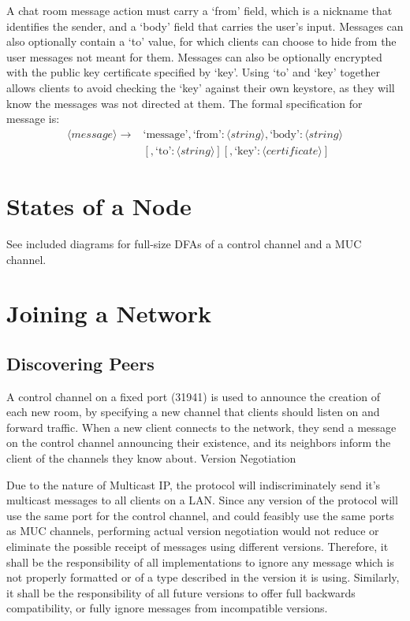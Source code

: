 \documentclass{article}
\begin{document}
A chat room message action must carry a `from' field, which is a nickname that
identifies the sender, and a `body' field that carries the user's input.
Messages can also optionally contain a `to' value, for which clients can choose
to hide from the user messages not meant for them. Messages can also be
optionally encrypted with the public key certificate specified by `key'. Using
`to' and `key' together allows clients to avoid checking the `key' against their
own keystore, as they will know the messages was not directed at them. The
formal specification for message is:
\begin{align*}
\langle message\rangle  \rightarrow& \text{`message'} , \text{`from'} : \langle
string\rangle  , \text{`body'} : \langle string\rangle \\
&[ , \text{`to'} :
\langle string\rangle  ] [ , \text{`key'}: \langle certificate\rangle  ]
\end{align*}
\section{States of a Node}
See included diagrams for full-size DFAs of a control channel and a MUC channel.
\begin{center}
\scalebox{.38}{

}
\end{center}

\begin{center}
\scalebox{.38}{

}
\end{center}
\section{Joining a Network}

\subsection{Discovering Peers}

A control channel on a fixed port (31941) is used to announce the creation of
each new room, by specifying a new channel that clients should listen on and
forward traffic. When a new client connects to the network, they send a message
on the control channel announcing their existence, and its neighbors inform the
client of the channels they know about.
Version Negotiation

Due to the nature of Multicast IP, the protocol will indiscriminately send it's
multicast messages to all clients on a LAN. Since any version of the protocol
will use the same port for the control channel, and could feasibly use the same
ports as MUC channels, performing actual version negotiation would not reduce or
eliminate the possible receipt of messages using different versions. Therefore,
it shall be the responsibility of all implementations to ignore any message
which is not properly formatted or of a type described in the version it is
using. Similarly, it shall be the responsibility of all future versions to offer
full backwards compatibility, or fully ignore messages from incompatible
versions.
\end{document}
